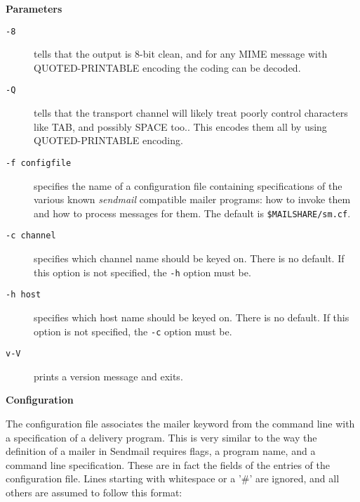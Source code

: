 {\bf Parameters}

\begin{description}
\item[{\tt -8}] \mbox{}

tells that the output is 8-bit clean, and for any
MIME message with QUOTED-PRINTABLE encoding the
coding can be decoded.



\item[{\tt -Q}] \mbox{}

tells that the transport channel will likely treat
poorly control characters like TAB, and possibly
SPACE too.. This encodes them all by using QUOTED-PRINTABLE encoding.



\item[{\tt -f configfile}] \mbox{}

specifies the name of a configuration file containing 
specifications of the various known {\em sendmail\/}
compatible mailer programs: how to invoke them and
how to process messages for them. The default is {\tt \$MAILSHARE/sm.cf}.



\item[{\tt -c channel}] \mbox{}

specifies which channel name should be keyed on.
There is no default. If this option is not specified, the {\tt -h} option must be.



\item[{\tt -h host}] \mbox{}

specifies which host name should be keyed on.
There is no default. If this option is not specified, the {\tt -c} option must be.



\item[{\tt v-V}] \mbox{}

prints a version message and exits.

\end{description}




{\bf Configuration}

The configuration file associates the mailer keyword from
the command line with a specification of a delivery program. 
This is very similar to the way the definition of a
mailer in Sendmail requires flags, a program name, and a
command line specification. These are in fact the fields
of the entries of the configuration file. Lines starting
with whitespace or a '\#' are ignored, and all others are
assumed to follow this format:

